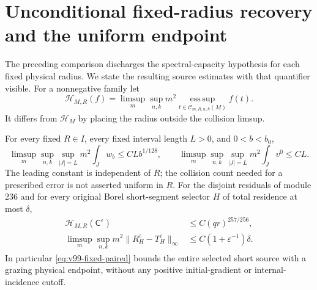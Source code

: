 \section{Unconditional fixed-radius recovery and the uniform endpoint}
\label{sec:v99-recovery}
The preceding comparison discharges the spectral-capacity hypothesis
for each fixed physical radius. We state the resulting source estimates
with that quantifier visible. For a nonnegative family let
\[
 \mathcal H_{M,R}(f)=\limsup_m\sup_{n,k}m^2
       \operatorname*{ess\,sup}_{t\in\mathcal C_{m,R,n,k}(M)}f(t).
\]
It differs from $\mathcal H_M$ by placing the radius outside the
collision limsup.

\begin{theorem}
\label{thm:v99-fixed-recovery}
For every fixed $R\in I$, every fixed interval length $L>0$, and
$0<b<b_0$,
\begin{equation}\label{eq:v99-fixed-insertion}
 \limsup_m\sup_{n,k}\sup_{|J|=L}m^2\int_J w_b
                  \le CLb^{1/128},\qquad
 \limsup_m\sup_{n,k}\sup_{|J|=L}m^2\int_J v^0\le CL.
\end{equation}
The leading constant is independent of $R$; the collision count
needed for a prescribed error is not asserted uniform in $R$.
For the disjoint residuals of module 236 and for every original Borel
short-segment selector $H$ of total residence at most $\delta$,
\begin{align}
 \mathcal H_{M,R}(\mathsf C^\varepsilon)&\le C(qr)^{257/256},
                                      \label{eq:v99-fixed-critical}\\
 \limsup_m\sup_{n,k}m^2
       \|R_H^\varepsilon-T_H^\varepsilon\|_\infty
                      &\le C(1+\varepsilon^{-1})\delta.
                                      \label{eq:v99-fixed-paired}
\end{align}
In particular \eqref{eq:v99-fixed-paired} bounds the entire selected
short source with a grazing physical endpoint, without any positive
initial-gradient or internal-incidence cutoff.
\end{theorem}
